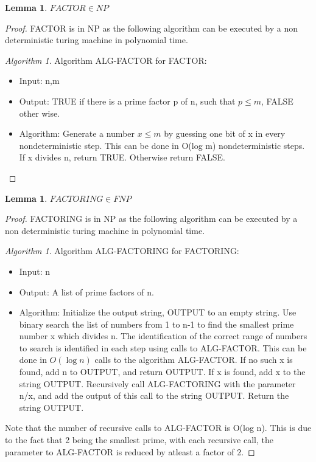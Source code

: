 \documentclass[10pt]{amsart}
\newtheorem{lem}[thm]{Lemma}
\theoremstyle{remark}
\newtheorem{alg}[thm]{Algorithm}
\begin{document}
\begin{lem}
$FACTOR \in NP$
\end{lem}

\begin{proof}
FACTOR is in NP as the following algorithm can be executed by a non deterministic turing machine in polynomial time.

\begin{alg}
Algorithm ALG-FACTOR for FACTOR:
\begin{itemize}
\item Input: n,m
\item Output: TRUE if there is a prime factor p of n, such that $p \leq m$, FALSE other wise.
\item Algorithm:
\subitem Generate a number $x \leq m$ by guessing one bit of x in every nondeterministic step. This can be done in O(log m) nondeterministic steps.
\subitem If x divides n, return TRUE. Otherwise return FALSE.
\end{itemize}
\end{alg}
\end{proof}

\begin{lem}
$FACTORING \in FNP$
\end{lem}
\begin{proof}
FACTORING is in NP as the following algorithm can be executed by a non deterministic turing machine in polynomial time.

\begin{alg}
Algorithm ALG-FACTORING for FACTORING:
\begin{itemize}
\item Input: n
\item Output: A list of prime factors of n.
\item Algorithm:
\subitem Initialize the output string, OUTPUT to an empty string.
\subitem Use binary search the list of numbers from 1 to n-1 to find the smallest prime number x which divides n. The identification of the correct range of numbers to search is identified in each step using calls to ALG-FACTOR. This can be done in $O(\log n)$ calls to the algorithm ALG-FACTOR.
\subitem If no such x is found, add n to OUTPUT, and return OUTPUT.
\subitem If x is found, add x to the string OUTPUT.
\subitem Recursively call ALG-FACTORING with the parameter n/x, and add the output of this call to the string OUTPUT.
\subitem Return the string OUTPUT.
\end{itemize}
\end{alg}

Note that the number of recursive calls to ALG-FACTOR is O(log n). This is due to the fact that 2 being the smallest prime, with each recursive call, the parameter to ALG-FACTOR is reduced by atleast a factor of 2.

\end{proof}
\end{document}
